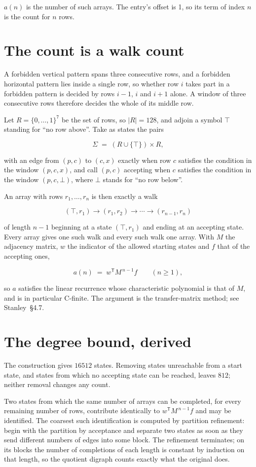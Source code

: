 \documentclass[11pt]{article}
\theoremstyle{definition}
\begin{document}
$a(n)$ is the number of such arrays. The entry's offset is 1, so its term of index $n$ is the count for $n$ rows.

\section{The count is a walk count}

A forbidden vertical pattern spans three consecutive rows, and a forbidden horizontal pattern lies inside a single row, so whether row $i$ takes part in a forbidden pattern is decided by rows $i-1$, $i$ and $i+1$ alone. A window of three consecutive rows therefore decides the whole of its middle row.

Let $R = \{0,\dots,1\}^{7}$ be the set of rows, so $|R| = 128$, and adjoin a symbol $\top$ standing for ``no row above''. Take as states the pairs

\[\Sigma \;=\; (R \cup \{\top\}) \times R,\]

with an edge from $(p,c)$ to $(c,x)$ exactly when row $c$ satisfies the condition in the window $(p,c,x)$, and call $(p,c)$ accepting when $c$ satisfies the condition in the window $(p,c,\bot)$, where $\bot$ stands for ``no row below''.

An array with rows $r_1,\dots,r_n$ is then exactly a walk

\[(\top,r_1) \to (r_1,r_2) \to \cdots \to (r_{n-1},r_n)\]

of length $n-1$ beginning at a state $(\top,r_1)$ and ending at an accepting state. Every array gives one such walk and every such walk one array. With $M$ the adjacency matrix, $w$ the indicator of the allowed starting states and $f$ that of the accepting ones,

\[a(n) \;=\; w^{\mathsf T} M^{\,n-1} f \qquad (n \ge 1),\]

so $a$ satisfies the linear recurrence whose characteristic polynomial is that of $M$, and is in particular C-finite. The argument is the transfer-matrix method; see Stanley~\S4.7.

\section{The degree bound, derived}

The construction gives $16512$ states. Removing states unreachable from a start state, and states from which no accepting state can be reached, leaves $812$; neither removal changes any count.

Two states from which the same number of arrays can be completed, for every remaining number of rows, contribute identically to $w^{\mathsf T}M^{\,n-1}f$ and may be identified. The coarsest such identification is computed by partition refinement: begin with the partition by acceptance and separate two states as soon as they send different numbers of edges into some block. The refinement terminates; on its blocks the number of completions of each length is constant by induction on that length, so the quotient digraph counts exactly what the original does.
\end{document}
